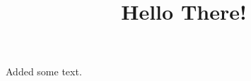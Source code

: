 \documentclass[a5paper, 12pt]{article}
\title{Hello There!}
\author{}
\date{}
\begin{document}
	\maketitle
	\thispagestyle{empty}
	Added some text.
\end{document}
